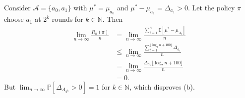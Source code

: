 \documentclass[10pt]{article}
\theoremstyle{definition}
\newenvironment{solution*}[1]{%
  \IfBlankTF{#1}
    {\renewcommand{\themanualsolutioninner}{\unskip}}
    {\renewcommand\themanualsolutioninner{#1}}%
  \manualsolutioninner
}{\endmanualsolutioninner}
\begin{document}
\begin{solution*}{}
\begin{itemize}
        Consider $\mathcal{A} = \{a_0, a_1\}$ with $\mu^* = \mu_{a_0}$ and $\mu^* - \mu_{a_1} = \Delta_{a_1} > 0$.
        Let the policy $\pi$ choose $a_1$ at $2^k$ rounds for $k \in \mathbb{N}$.
        Then 
        \begin{align*}
            \lim_{n \rightarrow \infty} \frac{R_n (\pi)}{n} &= \lim_{n \rightarrow \infty}\frac{\sum_{t=1}^{n} \mathbb{E}[\mu^* - \mu_{A_t}]}{n} \\
            &\leq \lim_{n \rightarrow \infty} \frac{\sum_{t=1}^{\lfloor \log_2 n + 100 \rfloor} \Delta_{a_1}}{n} \\
            &= \lim_{n \rightarrow \infty} \frac{\Delta_{a_1} \lfloor \log_2 n + 100 \rfloor}{n} \\
            &= 0.
        \end{align*}
        But $\lim_{n \rightarrow \infty} \mathbb{P}[\Delta_{A_{2^k}} > 0] = 1$ for $k \in \mathbb{N}$, which disproves (b).
    \end{itemize}
\end{solution*}
\end{document}
